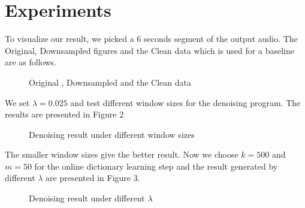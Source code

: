 \documentclass[UTF8]{article}
\begin{document}
\section{Experiments}

To visualize our result, we picked a 6 seconds segment of the output audio.
The Original, Downsampled figures and the Clean data which is used for a baseline are as follows.


\begin{figure}[H]
    \centering
    \caption{Original , Downsampled and the Clean data}
\end{figure}


We set $\lambda = 0.025$ and test different window sizes for the denoising program. The results are presented in Figure 2


\begin{figure}[H]
    \centering
    \caption{Denoising result under different window sizes}
\end{figure}


The smaller window sizes give the better result. Now we choose $k = 500$ and $m = 50$ for the online dictionary learning step and the result generated by different $\lambda$ are presented in Figure 3.


\begin{figure}[H]
    \centering
    \caption{Denoising result under different $\lambda$}
\end{figure}
\end{document}
